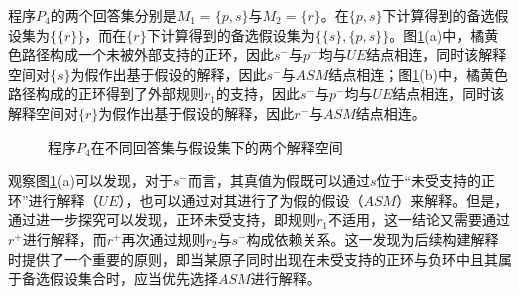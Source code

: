 \begin{example}
    程序$P_4$的两个回答集分别是$M_1=\{p,s\}$与$M_2=\{r\}$。在$\{p,s\}$下计算得到的备选假设集为$\{\{r\}\}$，而在$\{r\}$下计算得到的备选假设集为$\{\{s\}, \{p,s\}\}$。图\ref{fig:3_7}(a)中，橘黄色路径构成一个未被外部支持的正环，因此$s^-$与$p^-$均与$UE$结点相连，同时该解释空间对$\{s\}$为假作出基于假设的解释，因此$s^-$与$ASM$结点相连；图\ref{fig:3_7}(b)中，橘黄色路径构成的正环得到了外部规则$r_1$的支持，因此$s^-$与$p^-$均与$UE$结点相连，同时该解释空间对$\{r\}$为假作出基于假设的解释，因此$r^-$与$ASM$结点相连。
    \begin{figure}[htbp]
        \centering 
        \quad\quad
        \caption{程序\hyperref[prg:p_4]{$P_4$}在不同回答集与假设集下的两个解释空间}
        \label{fig:3_7}
    \end{figure}
    
    观察图\ref{fig:3_7}(a)可以发现，对于$s^-$而言，其真值为假既可以通过$s$位于“未受支持的正环”进行解释（$UE$），也可以通过对其进行了为假的假设（$ASM$）来解释。但是，通过进一步探究可以发现，正环未受支持，即规则$r_1$不适用，这一结论又需要通过$r^+$进行解释，而$r^+$再次通过规则$r_2$与$s^-$构成依赖关系。这一发现为后续构建解释时提供了一个重要的原则，即当某原子同时出现在未受支持的正环与负环中且其属于备选假设集合时，应当优先选择$ASM$进行解释。
\end{example}

